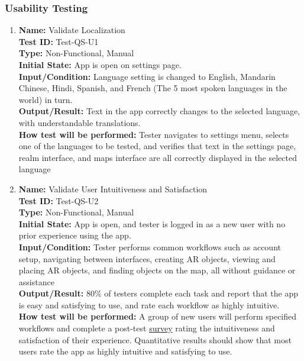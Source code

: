 \documentclass[12pt, titlepage]{article}
\begin{document}



\subsubsection{Usability Testing}



\begin{enumerate}

    \item \textbf{Name:} Validate Localization \label{itm:Test-QS-U1} \\
    \textbf{Test ID:} Test-QS-U1 \\
    \textbf{Type:} Non-Functional, Manual \\
    \textbf{Initial State:} App is open on settings page. \\
    \textbf{Input/Condition:} Language setting is changed to English, Mandarin Chinese, Hindi, Spanish, and French (The 5 most spoken languages in the world) in turn.  \\
    \textbf{Output/Result:} Text in the app correctly changes to the selected language, with understandable translations. \\
    \textbf{How test will be performed:} Tester navigates to settings menu, selects one of the languages to be tested, and verifies that text in the settings page, realm interface, and maps interface are all correctly displayed in the selected language

    \item \textbf{Name:} Validate User Intuitiveness and Satisfaction \label{itm:Test-QS-U2} \\
    \textbf{Test ID:} Test-QS-U2 \\
    \textbf{Type:} Non-Functional, Manual \\
    \textbf{Initial State:} App is open, and tester is logged in as a new user with no prior experience using the app. \\
    \textbf{Input/Condition:} Tester performs common workflows such as account setup, navigating between interfaces, creating AR objects, viewing and placing AR objects, and finding objects on the map, all without guidance or assistance  \\
    \textbf{Output/Result:} 80\% of testers complete each task and report that the app is easy and satisfying to use, and rate each workflow as highly intuitive.\\
    \textbf{How test will be performed:} A group of new users will perform specified workflows and complete a post-test \hyperref[sub:usability_survey]{survey} rating the intuitiveness and satisfaction of their experience. Quantitative results should show that most users rate the app as highly intuitive and satisfying to use.

\end{enumerate}
\end{document}

